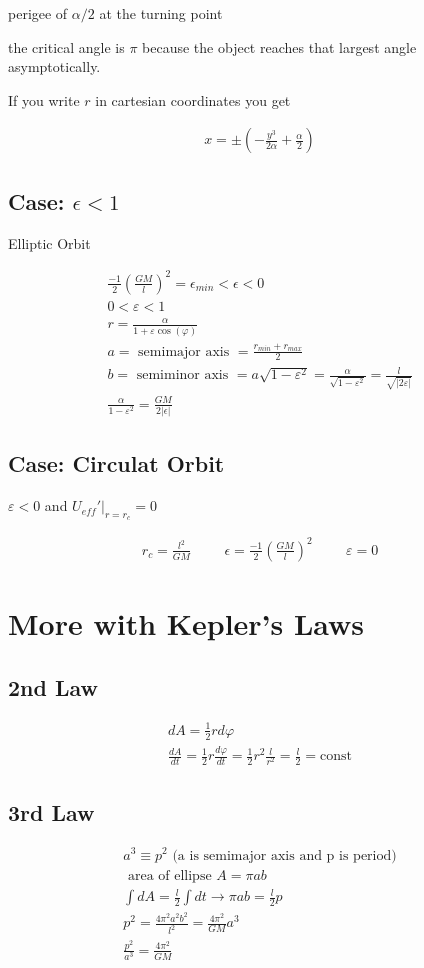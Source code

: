 \documentclass[fleqn]{report}
\newcommand{\hp}{\hspace{1cm}}
\newcommand{\const}{\textrm{const}}
\newcommand{\equations} [1] {
\begin{gather*}
#1
\end{gather*}
}
\begin{document}
perigee of $\alpha / 2$ at the turning point 

the critical angle is $\pi$ because the object reaches that largest angle asymptotically. 

If you write $r$ in cartesian coordinates you get 
\equations{
    x = \pm \left( -\frac{y^3}{2 \alpha } + \frac{\alpha}{2} \right)
}

\subsection{Case: $\epsilon < 1$}
Elliptic Orbit 
\equations{
    \frac{-1}{2} \left( \frac{GM}{l} \right)^2 = \epsilon_{min} < \epsilon < 0
    \\
    0 < \varepsilon < 1
    \\
    r = \frac{\alpha}{1 + \varepsilon \cos(\varphi)}
    \\
    a = \textrm{ semimajor axis } = \frac{r_{min} + r_{max}}{2}
    \\
    b = \textrm{ semiminor axis } = a \sqrt{1 - \varepsilon^2} = 
    \frac{\alpha}{\sqrt{1 - \varepsilon^2}} = \frac{l}{\sqrt{|2 \varepsilon |}}
    \\
    \frac{\alpha}{1 - \varepsilon^2} = \frac{GM}{2 |\epsilon|}
}


\subsection{Case: Circulat Orbit}
$\varepsilon < 0$ and $U_{eff}' \Big|_{r = r_c} = 0$

\equations{
    r_c = \frac{l^2}{GM}
    \hp
    \epsilon = \frac{-1}{2} \left( \frac{GM}{l} \right)^2
    \hp
    \varepsilon = 0
}

\section{More with Kepler's Laws}

\subsection{2nd Law}
\equations{
    dA = \frac{1}{2} r d \varphi
    \\
    \frac{dA}{dt} = \frac{1}{2} r \frac{d \varphi}{dt}
    =
    \frac{1}{2} r^2 \frac{l}{r^2} = \frac{l}{2} = \const
}


\subsection{3rd Law}
\equations{
    a^3 \equiv p^2
    \textrm{ (a is semimajor axis and p is period)}
    \\
    \textrm{ area of ellipse } A = \pi a b 
    \\
    \int dA = \frac{l}{2} \int dt 
    \rightarrow 
    \pi a b = \frac{l}{2} p
    \\
    p^2 = \frac{4 \pi^2 a^2 b^2}{l^2} = \frac{4 \pi^2}{GM} a^3
    \\
    \frac{p^2}{a^3} = \frac{4 \pi^2}{GM}
}
\end{document}
